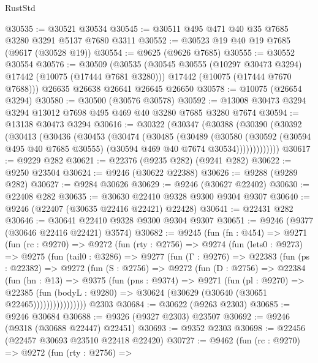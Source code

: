 \begin{lexlean}{RustStd}
\begin{coremodule}
@30535 := @30521 @30534
@30545 := @30511 @495 @471 @40 @35 @7685 @3280 @3291 @5137 @7680 @3311
@30552 := @30523 @19 @40 @19 @7685 (@9617 (@30528 @19))
@30554 := @9625 (@9626 @7685)
@30555 := @30552 @30554
@30576 := @30509
    (@30535
      (@30545 @30555 (@10297 @30473 @3294) @17442 (@10075 (@17444 @7681 @3280)))
      @17442
      (@10075 (@17444 @7670 @7688)))
    @26635
    @26638
    @26641
    @26645
    @26650
@30578 := @10075 (@26654 @3294)
@30580 := @30500 (@30576 @30578)
@30592 := @13008 @30473 @3294 @3294 @13012 @7698 @495 @469 @40 @3280 @7685 @3280 @7674
@30594 := @13138 @30473 @3294
@30616 := @30322
    (@30347
      (@30388
        (@30390
          (@30392
            (@30413
              (@30436
                (@30453
                  (@30474
                    (@30485
                      (@30489
                        (@30580
                          (@30592
                            (@30594 @495 @40 @7685 @30555)
                            (@30594 @469 @40 @7674 @30534)))))))))))))
@30617 := @9229 @282
@30621 := @22376 (@9235 @282) (@9241 @282)
@30622 := @9250 @23504
@30624 := @9246 (@30622 @22388)
@30626 := @9288 (@9289 @282)
@30627 := @9284 @30626
@30629 := @9246 (@30627 @22402)
@30630 := @22408 @282
@30635 := @30630 @22410 @9328 @9300 @9304 @9307
@30640 := @9246 (@22407 (@30635 @22416 @22421) @22428)
@30641 := @22431 @282
@30646 := @30641 @22410 @9328 @9300 @9304 @9307
@30651 := @9246 (@9377 (@30646 @22416 @22421) @3574)
@30682 := @9245
    (fun (fn : @454) =>
    @9271
      (fun (rc : @9270) =>
      @9272
        (fun (rty : @2756) =>
        @9274
          (fun (lets0 : @9273) =>
          @9275
            (fun (tail0 : @3286) =>
            @9277
              (fun (Γ : @9276) =>
              @22383
                (fun (ps : @22382) =>
                @9272
                  (fun (S : @2756) =>
                  @9272
                    (fun (D : @2756) =>
                    @22384
                      (fun (hn : @13) =>
                      @9375
                        (fun (pns : @9374) =>
                        @9271
                          (fun (pl : @9270) =>
                          @22385
                            (fun (bodyL : @9280) =>
                            @30624 (@30629 (@30640 (@30651 @22465))))))))))))))))
    @2303
@30684 := @30622 (@9263 @2303)
@30685 := @9246 @30684
@30688 := @9326 (@9327 @2303) @23507
@30692 := @9246 (@9318 (@30688 @22447) @22451)
@30693 := @9352 @2303
@30698 := @22456 (@22457 @30693 @23510 @22418 @22420)
@30727 := @9462
    (fun (rc : @9270) =>
    @9272
      (fun (rty : @2756) =>

\end{coremodule}
\end{lexlean}

